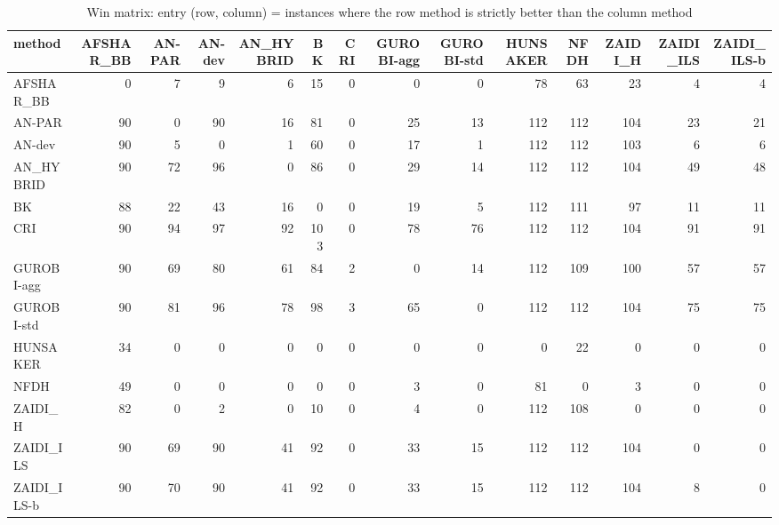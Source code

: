 \begin{table}[htbp]
\centering
\small
\caption{Win matrix: entry (row, column) = instances where the row method is strictly better than the column method}
\label{tab:E10a_state_of_the_art_b10_wins}
\begin{tabular}{lrrrrrrrrrrrrr}
\toprule
method & AFSHAR\_BB & AN-PAR & AN-dev & AN\_HYBRID & BK & CRI & GUROBI-agg & GUROBI-std & HUNSAKER & NFDH & ZAIDI\_H & ZAIDI\_ILS & ZAIDI\_ILS-b \\
\midrule
AFSHAR\_BB & 0 & 7 & 9 & 6 & 15 & 0 & 0 & 0 & 78 & 63 & 23 & 4 & 4 \\
AN-PAR & 90 & 0 & 90 & 16 & 81 & 0 & 25 & 13 & 112 & 112 & 104 & 23 & 21 \\
AN-dev & 90 & 5 & 0 & 1 & 60 & 0 & 17 & 1 & 112 & 112 & 103 & 6 & 6 \\
AN\_HYBRID & 90 & 72 & 96 & 0 & 86 & 0 & 29 & 14 & 112 & 112 & 104 & 49 & 48 \\
BK & 88 & 22 & 43 & 16 & 0 & 0 & 19 & 5 & 112 & 111 & 97 & 11 & 11 \\
CRI & 90 & 94 & 97 & 92 & 103 & 0 & 78 & 76 & 112 & 112 & 104 & 91 & 91 \\
GUROBI-agg & 90 & 69 & 80 & 61 & 84 & 2 & 0 & 14 & 112 & 109 & 100 & 57 & 57 \\
GUROBI-std & 90 & 81 & 96 & 78 & 98 & 3 & 65 & 0 & 112 & 112 & 104 & 75 & 75 \\
HUNSAKER & 34 & 0 & 0 & 0 & 0 & 0 & 0 & 0 & 0 & 22 & 0 & 0 & 0 \\
NFDH & 49 & 0 & 0 & 0 & 0 & 0 & 3 & 0 & 81 & 0 & 3 & 0 & 0 \\
ZAIDI\_H & 82 & 0 & 2 & 0 & 10 & 0 & 4 & 0 & 112 & 108 & 0 & 0 & 0 \\
ZAIDI\_ILS & 90 & 69 & 90 & 41 & 92 & 0 & 33 & 15 & 112 & 112 & 104 & 0 & 0 \\
ZAIDI\_ILS-b & 90 & 70 & 90 & 41 & 92 & 0 & 33 & 15 & 112 & 112 & 104 & 8 & 0 \\
\bottomrule
\end{tabular}
\end{table}
